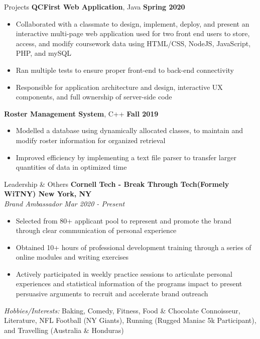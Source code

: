 \documentclass{resume}
\begin{document}
\begin{rSection}{Projects}
{\bf QCFirst Web Application}, Java \hfill {\bf Spring 2020} 
        \begin{itemize}
            \itemsep-0.6em 
            \item Collaborated with a classmate to design, implement, deploy, and present an interactive multi-page web application used for two front end users to store, access, and modify coursework data using HTML/CSS, NodeJS, JavaScript, PHP, and mySQL
            \item Ran multiple tests to ensure proper front-end to back-end connectivity 
            \item Responsible for application architecture and design, interactive UX components, and full ownership of server-side code 

        \end{itemize}
{\bf Roster Management System}, C++ \hfill {\bf Fall 2019}
        \begin{itemize}
            \itemsep-0.6em 
            \item Modelled a database using dynamically allocated classes, to maintain and modify roster information for organized retrieval 
            \item Improved efficiency by implementing a text file parser to transfer larger quantities of data in optimized time

        \end{itemize}
\end{rSection}
\begin{rSection}{Leadership \& Others}
{\bf Cornell Tech - Break Through Tech(Formely WiTNY) \hfill New York, NY} \\
{\it Brand Ambassador \hfill Mar 2020 - Present}
    \begin{itemize}
        \itemsep-0.6em 
        \item Selected from 80+ applicant pool to represent and promote the brand through clear communication of personal experience 
	    \item Obtained 10+ hours of professional development training through a series of online modules and writing exercises 
        \item Actively participated in weekly practice sessions to articulate personal experiences and statistical information of the programs impact to present persuasive arguments to recruit and accelerate brand outreach
    \end{itemize}
{\it Hobbies/Interests:} Baking, Comedy, Fitness, Food \& Chocolate Connoisseur, Literature, NFL Football (NY Giants), Running (Rugged Maniac 5k Participant), and Travelling (Australia & Honduras)
\end{rSection}
\end{document}
